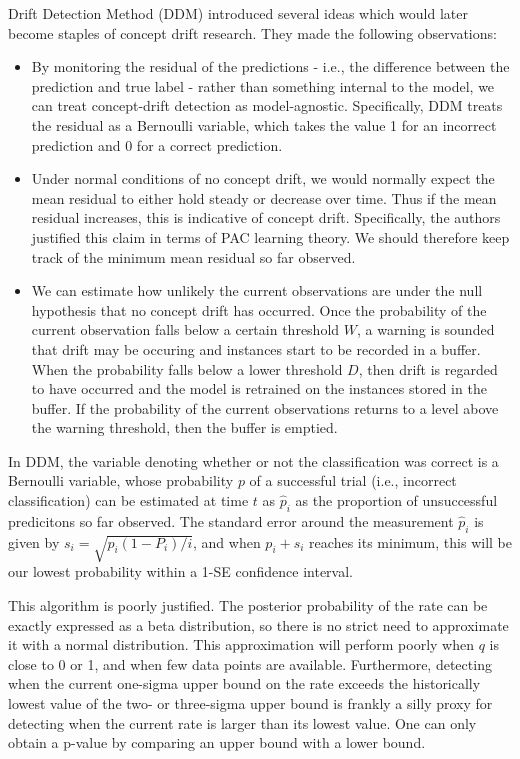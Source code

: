 Drift Detection Method (DDM) introduced several ideas which would later become staples of concept drift research. They made the following observations:
\begin{itemize}
    \item By monitoring the residual of the predictions - i.e., the difference between the prediction and true label - rather than something internal to the model, we can treat concept-drift detection as model-agnostic. Specifically, DDM treats the residual as a Bernoulli variable, which takes the value 1 for an incorrect prediction and 0 for a correct prediction.
    \item Under normal conditions of no concept drift, we would normally expect the mean residual to either hold steady or decrease over time. Thus if the mean residual increases, this is indicative of concept drift. Specifically, the authors justified this claim in terms of PAC learning theory. We should therefore keep track of the minimum mean residual so far observed.
    \item We can estimate how unlikely the current observations are under the null hypothesis that no concept drift has occurred. Once the probability of the current observation falls below a certain threshold $W$, a warning is sounded that drift may be occuring and instances start to be recorded in a buffer. When the probability falls below a lower threshold $D$, then drift is regarded to have occurred and the model is retrained on the instances stored in the buffer. If the probability of the current observations returns to a level above the warning threshold, then the buffer is emptied.
\end{itemize}
In DDM, the variable denoting whether or not the classification was correct is a Bernoulli variable, whose probability $p$ of a successful trial (i.e., incorrect classification) can be estimated at time $t$ as $\hat{p}_i$ as the proportion of unsuccessful predicitons so far observed. The standard error around the measurement $\hat{p}_i$ is given by $s_i = \sqrt{p_i(1-P_i)/i}$, and when $p_i+s_i$ reaches its minimum, this will be our lowest probability within a 1-SE confidence interval.

This algorithm is poorly justified. The posterior probability of the rate can be exactly expressed as a beta distribution, so there is no strict need to approximate it with a normal distribution. This approximation will perform poorly when $q$ is close to 0 or 1, and when few data points are available. Furthermore, detecting when the current one-sigma upper bound on the rate exceeds the historically lowest value of the two- or three-sigma upper bound is frankly a silly proxy for detecting when the current rate is larger than its lowest value. One can only obtain a p-value by comparing an upper bound with a lower bound.

